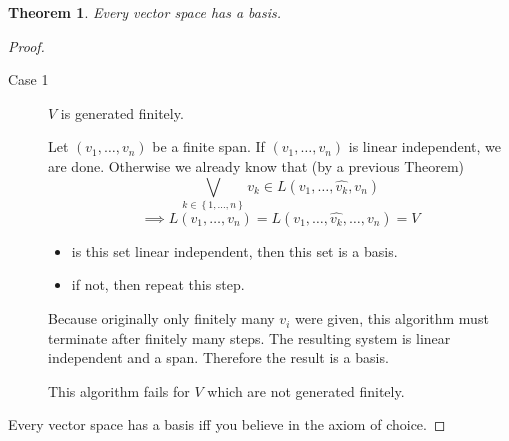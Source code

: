 \documentclass[a4paper,landscape,twocolumn]{article}
\newcommand\set[1]{\left\{#1\right\}}
\newtheorem{theorem}{Theorem}[section]
\begin{document}
\begin{theorem}
  Every vector space has a basis.
\end{theorem}
\begin{proof}
  \begin{description}
    \item[Case 1]
      $V$ is generated finitely.

      Let $(v_1, \ldots, v_n)$ be a finite span. If $(v_1, \ldots, v_n)$ is linear independent, we are done.
      Otherwise we already know that (by a previous Theorem)
      \[ \bigvee_{k \in \set{1, \ldots, n}} v_k \in L(v_1, \ldots, \hat{v_k},  v_n) \]
      \[ \implies L(v_1, \ldots, v_n) = L(v_1, \ldots, \hat{v_k}, \ldots, v_n) = V \]
      \begin{itemize}
        \item is this set linear independent, then this set is a basis.
        \item if not, then repeat this step.
      \end{itemize}

      Because originally only finitely many $v_i$ were given, this algorithm must terminate after finitely many steps.
      The resulting system is linear independent and a span.
      Therefore the result is a basis.

      This algorithm fails for $V$ which are not generated finitely.
  \end{description}

  Every vector space has a basis iff you believe in the axiom of choice.
\end{proof}
\end{document}
